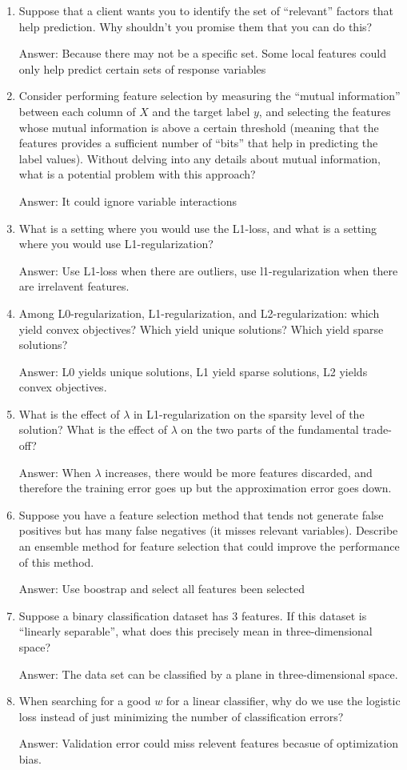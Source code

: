 \documentclass{article}
\def\ans#1{\par\gre{Answer: #1}}
\def\gre#1{{\color{gre}#1}}
\def\enum#1{\begin{enumerate}#1\end{enumerate}}
\begin{document}
\enum{
\item Suppose that a client wants you to identify the set of ``relevant'' factors that help prediction. Why shouldn't you promise them that you can do this?
\ans{Because there may not be a specific set. Some local features could only help predict certain sets of response variables}
\item Consider performing feature selection by measuring the ``mutual information'' between each column of $X$ and the target label $y$, and selecting the features whose mutual information is above a certain threshold (meaning that the features provides a sufficient number of ``bits'' that help in predicting the label values). Without delving into any details about mutual information, what is a potential problem with this approach?
\ans{It could ignore variable interactions}
\item What is a setting where you would use the L1-loss, and what is a setting where you would use L1-regularization?
\ans{Use L1-loss when there are outliers, use l1-regularization when there are irrelavent features.}
\item Among L0-regularization, L1-regularization, and L2-regularization: which yield convex objectives? Which yield unique solutions? Which yield sparse solutions?
\ans{L0 yields unique solutions, L1 yield sparse solutions, L2 yields convex objectives.}
\item What is the effect of $\lambda$ in L1-regularization on the sparsity level of the solution? What is the effect of $\lambda$ on the two parts of the fundamental trade-off?
\ans{When $\lambda$ increases, there would be more features discarded, and therefore the training error goes up but the approximation error goes down.}
\item Suppose you have a feature selection method that tends not generate false positives but has many false negatives (it misses relevant variables). Describe an ensemble method for feature selection that could improve the performance of this method.
\ans{Use boostrap and select all features been selected}
\item Suppose a binary classification dataset has 3 features. If this dataset is ``linearly separable'', what does this precisely mean in three-dimensional space?
\ans{The data set can be classified by a plane in three-dimensional space.}
\item When searching for a good $w$ for a linear classifier, why do we use the logistic loss instead of just minimizing the number of classification errors?
\ans{Validation error could miss relevent features becasue of  optimization bias.}
}
\end{document}

